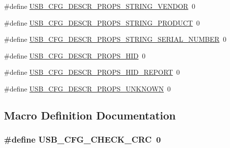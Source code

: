 \begin{DoxyCompactItemize}
\item 
\#define \hyperlink{mhvlib-_vusb-_console_2vusb_2usbconfig_8h_a55edf2117128387162339d98ba2af0f4}{U\-S\-B\-\_\-\-C\-F\-G\-\_\-\-D\-E\-S\-C\-R\-\_\-\-P\-R\-O\-P\-S\-\_\-\-S\-T\-R\-I\-N\-G\-\_\-\-V\-E\-N\-D\-O\-R}~0
\item 
\#define \hyperlink{mhvlib-_vusb-_console_2vusb_2usbconfig_8h_aa08084f9755a643e02d469b66b129ef6}{U\-S\-B\-\_\-\-C\-F\-G\-\_\-\-D\-E\-S\-C\-R\-\_\-\-P\-R\-O\-P\-S\-\_\-\-S\-T\-R\-I\-N\-G\-\_\-\-P\-R\-O\-D\-U\-C\-T}~0
\item 
\#define \hyperlink{mhvlib-_vusb-_console_2vusb_2usbconfig_8h_a82224c07d3a1f9fcccbff70b71c8ea51}{U\-S\-B\-\_\-\-C\-F\-G\-\_\-\-D\-E\-S\-C\-R\-\_\-\-P\-R\-O\-P\-S\-\_\-\-S\-T\-R\-I\-N\-G\-\_\-\-S\-E\-R\-I\-A\-L\-\_\-\-N\-U\-M\-B\-E\-R}~0
\item 
\#define \hyperlink{mhvlib-_vusb-_console_2vusb_2usbconfig_8h_adfbd53b5310c36b1e4b06d6a3b992e8a}{U\-S\-B\-\_\-\-C\-F\-G\-\_\-\-D\-E\-S\-C\-R\-\_\-\-P\-R\-O\-P\-S\-\_\-\-H\-I\-D}~0
\item 
\#define \hyperlink{mhvlib-_vusb-_console_2vusb_2usbconfig_8h_a248eae427d6cea0046661eb8438b7198}{U\-S\-B\-\_\-\-C\-F\-G\-\_\-\-D\-E\-S\-C\-R\-\_\-\-P\-R\-O\-P\-S\-\_\-\-H\-I\-D\-\_\-\-R\-E\-P\-O\-R\-T}~0
\item 
\#define \hyperlink{mhvlib-_vusb-_console_2vusb_2usbconfig_8h_a3c9ed2d932cf0f5fc9788a91028a8b4b}{U\-S\-B\-\_\-\-C\-F\-G\-\_\-\-D\-E\-S\-C\-R\-\_\-\-P\-R\-O\-P\-S\-\_\-\-U\-N\-K\-N\-O\-W\-N}~0
\end{DoxyCompactItemize}


\subsection{Macro Definition Documentation}
\hypertarget{mhvlib-_vusb-_console_2vusb_2usbconfig_8h_a57122aa75d9b598adcd238aee5f2b4b7}{
\subsubsection[{U\-S\-B\-\_\-\-C\-F\-G\-\_\-\-C\-H\-E\-C\-K\-\_\-\-C\-R\-C}]{\setlength{\rightskip}{0pt plus 5cm}\#define U\-S\-B\-\_\-\-C\-F\-G\-\_\-\-C\-H\-E\-C\-K\-\_\-\-C\-R\-C~0}}\label{mhvlib-_vusb-_console_2vusb_2usbconfig_8h_a57122aa75d9b598adcd238aee5f2b4b7}


